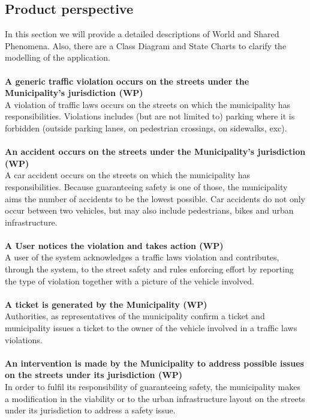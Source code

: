 \documentclass {article}
\begin{document}
	\subsection{Product perspective} 
	In this section we will provide a detailed descriptions of World and Shared Phenomena. Also, there are a Class Diagram and State Charts to clarify the modelling of the application. \\ \\
	{\bf A generic traffic violation occurs on the streets under the \mbox{Municipality's} jurisdiction (WP)} \\
		A violation of traffic laws occurs on the streets on which the municipality has responsibilities.
Violations includes (but are not limited to) parking where it is forbidden (outside parking lanes, on pedestrian crossings, on sidewalks, exc). \\ \\
	{\bf An accident occurs on the streets under the Municipality's jurisdiction (WP)} \\
		A car accident occurs on the streets on which the municipality has responsibilities. Because guaranteeing safety is one of those, the municipality aims the number of accidents to be the lowest possible. Car accidents do not only occur between two vehicles, but may also include pedestrians, bikes and urban infrastructure. \\ \\
	{\bf A User notices the violation and takes action (WP)} \\
		A user of the system acknowledges a traffic laws violation and contributes, through the system, to the street safety and rules enforcing effort by reporting the type of violation together with a picture of the vehicle involved. \\ \\
	{\bf A ticket is generated by the Municipality (WP)}\\
		Authorities, as representatives of the municipality confirm a ticket and municipality issues a ticket to the owner of the vehicle involved in a traffic laws violations. \\ \\
	{\bf An intervention is made by the Municipality to address possible issues on the streets under its jurisdiction (WP)} \\
		In order to fulfil its responsibility of guaranteeing safety, the municipality makes a modification in the viability or to the urban infrastructure layout on the streets under its jurisdiction to address a safety issue.\\ \\
\end{document}
